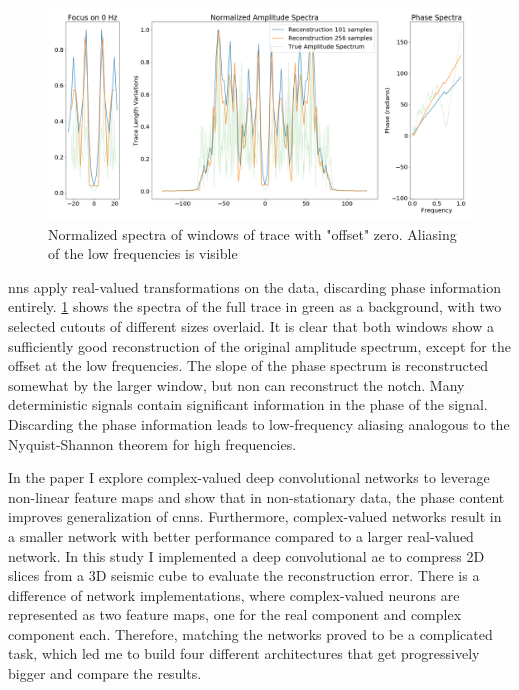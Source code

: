 \begin{figure}
    \centering
    \includegraphics[width=\textwidth]{figures/information-windowing.png}
    \caption{Normalized spectra of windows of trace with "offset" zero. Aliasing of the low frequencies is visible \citep[from][]{dramsch2018information}}
    \label{fig:seismic-window}
\end{figure}

\aclp{nn} apply real-valued transformations on the data, discarding phase information entirely. \cref{fig:seismic-window} shows the spectra of the full trace in green as a background, with two selected cutouts of different sizes overlaid. It is clear that both windows show a sufficiently good reconstruction of the original amplitude spectrum, except for the offset at the low frequencies. The slope of the phase spectrum is reconstructed somewhat by the larger window, but non can reconstruct the notch. Many deterministic signals contain significant information in the phase of the signal. Discarding the phase information leads to low-frequency aliasing analogous to the Nyquist-Shannon theorem for high frequencies.

In the paper  I explore complex-valued deep convolutional networks to leverage non-linear feature maps and show that in non-stationary data, the phase content improves generalization of \acp{cnn}. Furthermore, complex-valued networks result in a smaller network with better performance compared to a larger real-valued network. In this study I implemented a deep convolutional \acl{ae} to compress 2D slices from a 3D seismic cube to evaluate the reconstruction error. There is a difference of network implementations, where complex-valued neurons are represented as two feature maps, one for the real component and complex component each. Therefore, matching the networks proved to be a complicated task, which led me to build four different architectures that get progressively bigger and compare the results.

